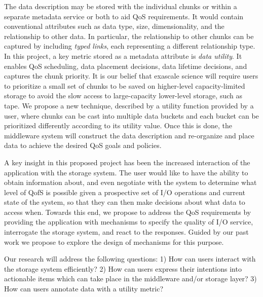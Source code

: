 The data description may be stored with the individual chunks or within a
separate metadata service or both to aid QoS requirements. It would contain
conventional attributes such as data type, size, dimensionality, and the
relationship to other data. In particular, the relationship to other chunks can
be captured by including \textit{typed links}, each representing a different
relationship type.  In this project, a key metric stored as a metadata
attribute is \textit{data utility}.  It enables QoS scheduling, data placement
decisions, data lifetime decisions, and captures the chunk priority. It is
our belief that exascale science will require users to prioritize a small set
of chunks to be saved on higher-level capacity-limited storage to avoid the
slow access to large-capacity lower-level storage, such as tape.  We propose a
new technique, described by a utility function provided by a user, where chunks
can be cast into multiple data buckets and each bucket can be prioritized
differently according to its utility value.  Once this is done, the middleware
system will construct the data description and re-organize and place data to
achieve the desired QoS goals and policies.

A key insight in this proposed project has been the increased interaction of
the application with the storage system.
The user would like to have the ability to obtain information about, and even
negotiate with the system to determine what
level of QofS is possible given
a prospective set of I/O operations and current state of the system, so that
they can then make decisions about what data to access when.
Towards this end, we propose to
address the QoS requirements by providing the application with mechanisms to
specify the quality of I/O service, interrogate the storage system, and react
to the responses. Guided by our past work we propose to explore the design of
mechanisms for this purpose. 

Our research will address the following questions:
1) How can users interact with the storage system efficiently?
2) How can users express their intentions into actionable items which can take place in the middleware and/or storage layer?
3) How can users annotate data with a utility metric?

